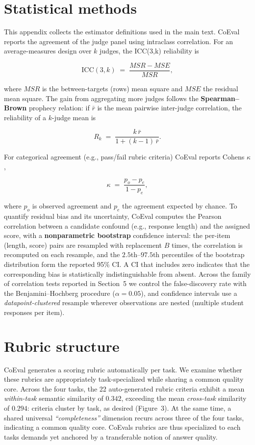 \section{Statistical methods}\label{appA}

This appendix collects the estimator definitions used in the main text. CoEval reports the agreement of the judge
panel using intraclass correlation. For an average-measures design over \(k\) judges, the ICC(3,k) reliability is

\[\mathrm{ICC}(3,k) \;=\; \frac{MSR - MSE}{MSR},\]

where \(MSR\) is the between-targets (rows) mean square and \(MSE\) the residual mean square. The gain from aggregating
more judges follows the \textbf{Spearman--Brown} prophecy relation: if \(\bar{r}\) is the mean pairwise
inter-judge correlation, the reliability of a \(k\)-judge mean is

\[R_k \;=\; \frac{k\,\bar{r}}{1 + (k-1)\,\bar{r}}.\]

For categorical agreement (e.g., pass/fail rubric criteria) CoEval reports Cohen\textquotesingle s \(\kappa\),

\[\kappa \;=\; \frac{p_o - p_e}{1 - p_e},\]

where \(p_o\) is observed agreement and \(p_e\) the agreement expected by chance. To quantify residual bias and its
uncertainty, CoEval computes the Pearson correlation between a candidate confound (e.g., response length) and the
assigned score, with a \textbf{nonparametric bootstrap} confidence interval: the per-item (length, score)
pairs are resampled with replacement \(B\) times, the correlation is recomputed on each resample, and the
\(2.5\)th--\(97.5\)th percentiles of the bootstrap distribution form the reported 95\% CI. A CI that includes zero
indicates that the corresponding bias is statistically indistinguishable from absent. Across the family of correlation
tests reported in Section~5 we control the false-discovery rate with the Benjamini--Hochberg procedure
(\(\alpha = 0.05\)), and confidence intervals use a \emph{datapoint-clustered} resample wherever observations are
nested (multiple student responses per item).

\section{Rubric structure}\label{appB}

CoEval generates a scoring rubric automatically per task. We examine whether these rubrics are appropriately
task-specialized while sharing a common quality core. Across the four tasks, the 22 auto-generated rubric criteria
exhibit a mean \emph{within-task} semantic similarity of \(0.342\), exceeding the mean \emph{cross-task} similarity
of \(0.294\): criteria cluster by task, as desired (Figure~3). At the same time, a shared universal
\emph{``completeness''} dimension recurs across three of the four tasks, indicating a common quality core.
CoEval\textquotesingle s rubrics are thus specialized to each task\textquotesingle s demands yet anchored by a transferable notion of answer quality.

